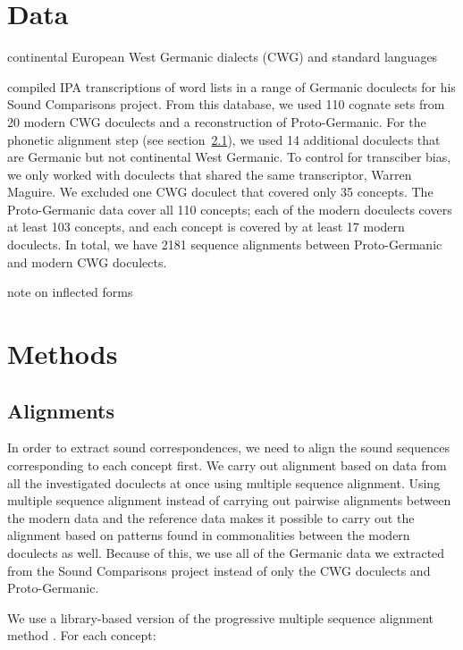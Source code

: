 \documentclass[a4paper]{article}
\begin{document}
\newpage
\section{Data}

continental European West Germanic dialects (CWG) and standard languages

\citet{heggarty2018sound} compiled IPA transcriptions of word lists in a range of Germanic doculects for his Sound Comparisons project.
From this database, we used 110 cognate sets from 20 modern CWG doculects and a reconstruction of Proto-Germanic.
For the phonetic alignment step (see section~\ref{s:alignments}), we used 14 additional doculects that are Germanic but not continental West Germanic. 
To control for transciber bias, we only worked with doculects that shared the same transcriptor, Warren Maguire.
We excluded one CWG doculect that covered only 35 concepts. %
The Proto-Germanic data cover all 110 concepts; each of the modern doculects covers at least 103 concepts, and each concept is covered by at least 17 modern doculects.
In total, we have 2181 sequence alignments between Proto-Germanic and modern CWG doculects.

note on inflected forms

\newpage
\section{Methods}

\subsection{Alignments}
\label{s:alignments}

In order to extract sound correspondences, we need to align the sound sequences corresponding to each concept first.
We carry out alignment based on data from all the investigated doculects at once using multiple sequence alignment.
Using multiple sequence alignment instead of carrying out pairwise alignments between the modern data and the reference data makes it possible to carry out the alignment based on patterns found in commonalities between the modern doculects as well.
Because of this, we use all of the Germanic data we extracted from the Sound Comparisons project instead of only the CWG doculects and Proto-Germanic.

We use a library-based version \citep{notredame2000t-coffee:} of the progressive multiple sequence alignment method \citep{thompson1994clustal}.
For each concept:
\end{document}
